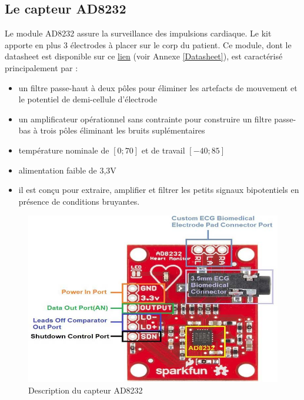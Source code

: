 \subsection{Le capteur AD8232 \label{sec:capteurAD8232}}
Le module AD8232 assure la surveillance des impulsions cardiaque. Le kit apporte en plus 3 électrodes à placer sur le corp du patient. Ce module, dont le datasheet est disponible sur ce \href{https://www.analog.com/media/en/technical-documentation/data-sheets/ad8232.pdf}{lien} (voir Annexe \ref{Datasheet}), est caractérisé principalement par :
\begin{itemize}
  \item un filtre passe-haut à deux pôles pour éliminer les artefacts de mouvement et le potentiel de demi-cellule d'électrode
  \item un amplificateur opérationnel sans contrainte pour construire un filtre passe-bas à trois pôles éliminant les bruits suplémentaires
  \item température nominale de $[0;70]$ et de travail $[-40; 85]$
  \item alimentation faible de 3,3V
  \item il est conçu pour extraire, amplifier et filtrer les petits signaux bipotentiels en présence de conditions bruyantes.
\end{itemize}

\begin{figure}[H]
  \centering
  \includegraphics[scale=.4]{imgs/AD8232-Module-Overview.jpg}
  \caption{Description du capteur AD8232}
\end{figure}

